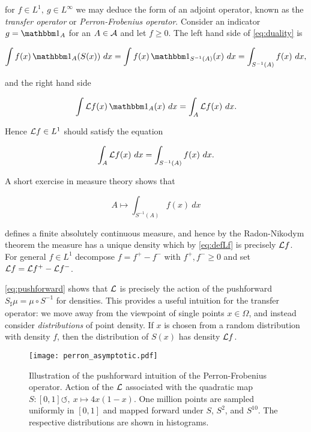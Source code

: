 for $f \in L^1,\ g \in L^\infty$ we may deduce the form of an adjoint operator, known as 
the \emph{transfer operator} or \emph{Perron-Frobenius operator}. Consider an indicator 
$g = \bbone_A$ for an $A \in \mathcal{A}$ and let $f \geq 0$. The left hand side of 
\ref{eq:duality} is

\begin{equation}
    \int f (x) \, \bbone_A ( S (x) )\ dx 
    = \int f (x) \, \bbone_{S^{-1} (A)} (x)\ dx 
    = \int_{S^{-1} (A)} f (x)\ dx , 
\end{equation}

and the right hand side 

\begin{equation}
    \int \scrL f (x)\, \bbone_A (x)\ dx
    = \int_A \scrL f (x)\ dx . 
\end{equation}

Hence $\mathcal{L} f \in L^1$ should satisfy the equation 

\begin{equation}
    \label{eq:defLf}
    \int_A \mathcal{L} f (x)\ dx = \int_{S^{-1} (A)} f (x)\ dx . 
\end{equation}

A short exercise in measure theory shows that 

\begin{equation}
    \label{eq:pushforward}
    A \mapsto \int_{S^{-1} (A)} f (x)\ dx
\end{equation}

defines a finite absolutely continuous measure, and hence by the Radon-Nikodym theorem 
the measure has a unique density which by \ref{eq:defLf} is precisely $\mathcal{L} f$. For 
general $f \in L^1$ decompose $f = f^+ - f^-$ with $f^+, f^- \geq 0$ and set 
$\mathcal{L} f = \mathcal{L} f^+ - \mathcal{L} f^-$. 

\ref{eq:pushforward} shows that $\mathcal{L}$ is precisely the action of the pushforward 
$S_\sharp \mu = \mu \circ S^{-1}$ for densities. This provides a useful intuition for 
the transfer operator: we move away from the viewpoint of single points $x \in \Omega$, 
and instead consider \emph{distributions} of point density. If $x$ is 
chosen from a random distribution with density $f$, then the distribution of $S (x)$ has 
density $\mathcal{L} f$. 

\begin{figure}
    \centering
    \texttt{[image: perron\_asymptotic.pdf]}
    \caption{
        Illustration of the pushforward intuition of the Perron-Frobenius operator. 
        Action of the $\mathcal{L}$ associated with the quadratic map 
        $S : [0, 1] \circlearrowleft,\ x \mapsto 4 x (1 - x)$. One million points are 
        sampled uniformly in $[0, 1]$ and mapped forward under $S$, $S^2$, and $S^{10}$. 
        The respective distributions are shown in histograms. 
    }\label{fig:perron_asymptotic}
\end{figure}


